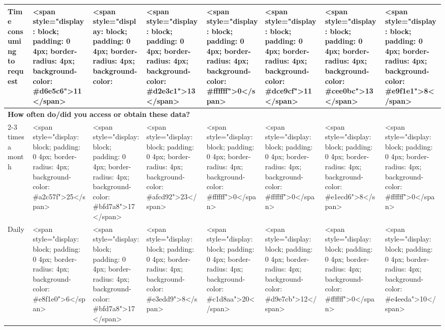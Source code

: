\documentclass[
]{article}
\begin{document}
\begin{table}
\begin{tabular}[t]{l|l|l|l|l|l|l|l}
\hspace{1em}Time consuming to request & <span style="display: block; padding: 0 4px; border-radius: 4px; background-color: #d6e5c6">11</span> & <span style="display: block; padding: 0 4px; border-radius: 4px; background-color: #84b256">33</span> & <span style="display: block; padding: 0 4px; border-radius: 4px; background-color: #d2e3c1">13</span> & <span style="display: block; padding: 0 4px; border-radius: 4px; background-color: #ffffff">0</span> & <span style="display: block; padding: 0 4px; border-radius: 4px; background-color: #dce9cf">11</span> & <span style="display: block; padding: 0 4px; border-radius: 4px; background-color: #cee0bc">13</span> & <span style="display: block; padding: 0 4px; border-radius: 4px; background-color: #e9f1e1">8</span>\\
\hline
\multicolumn{8}{l}{\textbf{How often do/did you access or obtain these data?}}\\
\hline
\hspace{1em}2-3 times a month & <span style="display: block; padding: 0 4px; border-radius: 4px; background-color: #a2c57f">25</span> & <span style="display: block; padding: 0 4px; border-radius: 4px; background-color: #bfd7a8">17</span> & <span style="display: block; padding: 0 4px; border-radius: 4px; background-color: #afcd92">23</span> & <span style="display: block; padding: 0 4px; border-radius: 4px; background-color: #ffffff">0</span> & <span style="display: block; padding: 0 4px; border-radius: 4px; background-color: #ffffff">0</span> & <span style="display: block; padding: 0 4px; border-radius: 4px; background-color: #e1ecd6">8</span> & <span style="display: block; padding: 0 4px; border-radius: 4px; background-color: #ffffff">0</span>\\
\hline
\hspace{1em}Daily & <span style="display: block; padding: 0 4px; border-radius: 4px; background-color: #e8f1e0">6</span> & <span style="display: block; padding: 0 4px; border-radius: 4px; background-color: #bfd7a8">17</span> & <span style="display: block; padding: 0 4px; border-radius: 4px; background-color: #e3edd9">8</span> & <span style="display: block; padding: 0 4px; border-radius: 4px; background-color: #c1d8aa">20</span> & <span style="display: block; padding: 0 4px; border-radius: 4px; background-color: #d9e7cb">12</span> & <span style="display: block; padding: 0 4px; border-radius: 4px; background-color: #ffffff">0</span> & <span style="display: block; padding: 0 4px; border-radius: 4px; background-color: #e4eeda">10</span>\\

\end{tabular}
\end{table}
\end{document}
